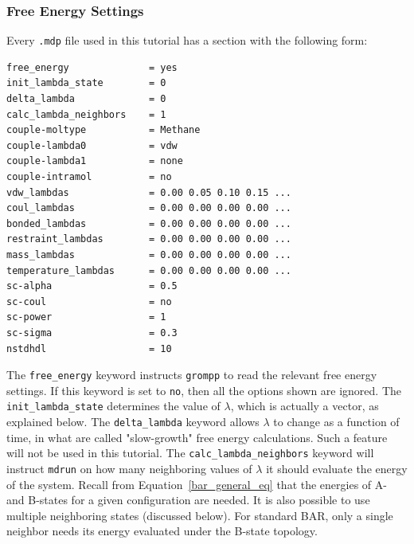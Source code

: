 \documentclass[9pt,tutorial,pubversion]{livecoms}
\begin{document}
\subsubsection{Free Energy Settings} \label{vdw_settings}

Every \texttt{.mdp} file used in this tutorial has a section with the following form:

\begin{lstlisting}[basicstyle=\footnotesize\ttfamily]
free_energy              = yes
init_lambda_state        = 0
delta_lambda             = 0
calc_lambda_neighbors    = 1
couple-moltype           = Methane
couple-lambda0           = vdw
couple-lambda1           = none
couple-intramol          = no
vdw_lambdas              = 0.00 0.05 0.10 0.15 ...
coul_lambdas             = 0.00 0.00 0.00 0.00 ...
bonded_lambdas           = 0.00 0.00 0.00 0.00 ...
restraint_lambdas        = 0.00 0.00 0.00 0.00 ...
mass_lambdas             = 0.00 0.00 0.00 0.00 ...
temperature_lambdas      = 0.00 0.00 0.00 0.00 ...
sc-alpha                 = 0.5
sc-coul                  = no
sc-power                 = 1
sc-sigma                 = 0.3
nstdhdl                  = 10
\end{lstlisting}

The \texttt{free\_energy} keyword instructs \texttt{grompp} to read the relevant free energy settings. If this keyword is set to \texttt{no}, then all the options shown are ignored. The \texttt{init\_lambda\_state} determines the value of $\lambda$, which is actually a vector, as explained below. The \texttt{delta\_lambda} keyword allows $\lambda$ to change as a function of time, in what are called "slow-growth" free energy calculations. Such a feature will not be used in this tutorial. The \texttt{calc\_lambda\_neighbors} keyword will instruct \texttt{mdrun} on how many neighboring values of $\lambda$ it should evaluate the energy of the system. Recall from Equation~\ref{bar_general_eq} that the energies of A- and B-states for a given configuration are needed. It is also possible to use multiple neighboring states (discussed below). For standard BAR, only a single neighbor needs its energy evaluated under the B-state topology.
\end{document}
